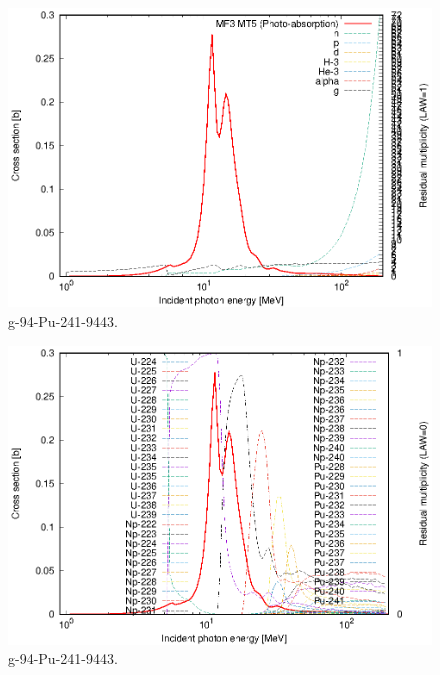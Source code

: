 \begin{figure}
 \includegraphics[width=\linewidth]{eps/g_94-Pu-241_9443.eps}
  \caption{g-94-Pu-241-9443.}
\end{figure}
\begin{figure}
 \includegraphics[width=\linewidth]{eps-law0/g_94-Pu-241_9443.eps}
 \caption{g-94-Pu-241-9443.}
\end{figure}
\newpage \clearpage


